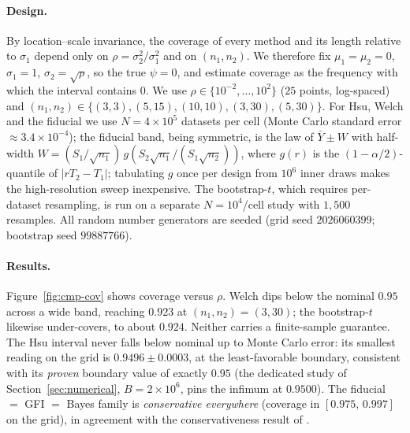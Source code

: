 \documentclass[12pt]{article}
\begin{document}
\paragraph{Design.}
By location--scale invariance, the coverage of every method and its length
relative to \(\sigma_1\) depend only on \(\rho=\sigma_2^2/\sigma_1^2\) and on
\((n_1,n_2)\).  We therefore fix \(\mu_1=\mu_2=0\), \(\sigma_1=1\),
\(\sigma_2=\sqrt\rho\), so the true \(\psi=0\), and estimate coverage as the
frequency with which the interval contains \(0\).  We use
\(\rho\in\{10^{-2},\dots,10^{2}\}\) (\(25\) points, log-spaced) and
\((n_1,n_2)\in\{(3,3),(5,15),(10,10),(3,30),(5,30)\}\).  For Hsu, Welch and the
fiducial we use \(N=4\times10^{5}\) datasets per cell (Monte Carlo standard error
\(\approx 3.4\times10^{-4}\)); the fiducial band, being symmetric, is the law of
\(\bar Y\pm W\) with half-width \(W=(S_1/\sqrt{n_1})\,g(S_2\sqrt{n_1}/(S_1\sqrt{n_2}))\),
where \(g(r)\) is the \((1-\alpha/2)\)-quantile of \(|rT_2-T_1|\); tabulating
\(g\) once per design from \(10^{6}\) inner draws makes the high-resolution sweep
inexpensive.  The bootstrap-\(t\), which requires per-dataset resampling, is run
on a separate \(N=10^{4}\)/cell study with \(1{,}500\) resamples.  All random
number generators are seeded (grid seed \(2026060399\); bootstrap seed
\(99887766\)).

\paragraph{Results.}
Figure~\ref{fig:cmp-cov} shows coverage versus \(\rho\).  Welch dips below the
nominal \(0.95\) across a wide band, reaching \(0.923\) at \((n_1,n_2)=(3,30)\);
the bootstrap-\(t\) likewise under-covers, to about \(0.924\).  Neither carries a
finite-sample guarantee.  The Hsu interval never falls below nominal up to Monte
Carlo error: its smallest reading on the grid is \(0.9496\pm0.0003\), at the
least-favorable boundary, consistent with its \emph{proven} boundary value of
exactly \(0.95\) (the dedicated study of Section~\ref{sec:numerical},
\(B=2\times10^{6}\), pins the infimum at \(0.9500\)).  The fiducial \(=\) GFI
\(=\) Bayes family is \emph{conservative everywhere} (coverage in
\([0.975,\,0.997]\) on the grid), in agreement with the conservativeness result
of \citet{Robinson1976}.
\end{document}
